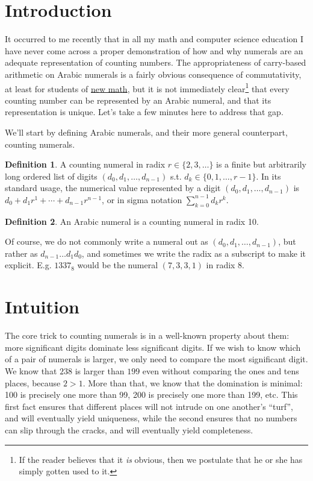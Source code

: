 \documentclass[12pt]{article}
\theoremstyle{definition}
\newtheorem{definition}{Definition}
\begin{document}
\maketitle

\section{Introduction}

It occurred to me recently that in all my math and computer science education I
have never come across a proper demonstration of how and why numerals are an
adequate representation of counting numbers. The appropriateness of carry-based
arithmetic on Arabic numerals is a fairly obvious consequence of commutativity,
at least for students of \href{https://www.youtube.com/watch?v=zWPn3esuDgU}{new
math}, but it is not immediately clear\footnote{If the reader believes that it
\emph{is} obvious, then we postulate that he or she has simply gotten used to
it.} that every counting number can be represented by an Arabic numeral, and
that its representation is unique. Let's take a few minutes here to address that
gap.

We'll start by defining Arabic numerals, and their more general counterpart,
counting numerals.

\begin{definition}
  A counting numeral in radix $r \in \{2, 3, \ldots\}$ is a finite but arbitrarily long ordered list of digits $(d_0, d_1,\ldots, d_{n-1})$ s.t. $ d_k \in \{0, 1, \ldots, r-1\}$. In its standard usage, the numerical value represented by a digit $(d_0, d_1,\ldots, d_{n-1})$ is $d_0 + d_1r^1 + \cdots + d_{n-1}r^{n-1}$, or in sigma notation $\sum_{k=0}^{n-1} d_kr^k$.
\end{definition}

\begin{definition}
  An Arabic numeral is a counting numeral in radix 10.
\end{definition}

Of course, we do not commonly write a numeral out as $(d_0, d_1, \ldots,
d_{n-1})$, but rather as $d_{n-1}\ldots d_1d_0$, and sometimes we write the radix
as a subscript to make it explicit. E.g. $1337_8$ would be the numeral $(7, 3,
3, 1)$ in radix 8.

\section{Intuition}

The core trick to counting numerals is in a well-known property about them: more
significant digits dominate less significant digits. If we wish to know which of
a pair of numerals is larger, we only need to compare the most significant
digit. We know that $238$ is larger than $199$ even without comparing the ones
and tens places, because $2 > 1$. More than that, we know that the domination is
minimal: 100 is precisely one more than 99, 200 is precisely one more than 199,
etc. This first fact ensures that different places will not intrude on one
another's ``turf'', and will eventually yield uniqueness, while the second
ensures that no numbers can slip through the cracks, and will eventually yield
completeness.
\end{document}
